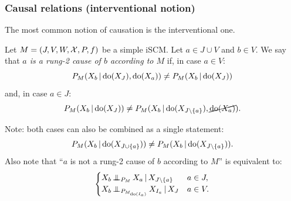 \subsubsection{Causal relations (interventional notion)}
The most common notion of causation is the interventional one.
\begin{Def}\label{def:scm_rung2_cause_of}
  Let $M = \left ( J, V, W, \mathcal{X}, P, f \right )$ be a simple iSCM.
  Let $a \in J \cup V$ and $b \in V$.
  We say that \emph{$a$ is a rung-2 cause of $b$ according to $M$} if, in case $a \in V$:
    $$P_{M}(X_b \operatorname*{|} \operatorname{do}(X_J), \operatorname{do}(X_a)) \ne P_{M}(X_b \operatorname*{|} \operatorname{do}(X_J))$$
  and, in case $a \in J$:
    $$P_{M}(X_b \operatorname*{|} \operatorname{do}(X_J)) \ne P_{M}(X_b \operatorname*{|} \operatorname{do}(X_{J\setminus \{a\}}),\cancel{\operatorname{do}(X_a)}).$$
\end{Def}
\begin{Rem}\label{rem:scm_rung2_cause_of}
  Note: both cases can also be combined as a single statement:
    $$P_{M}(X_b \operatorname*{|} \operatorname{do}(X_{J \cup \{a\}})) \ne P_{M}(X_b \operatorname*{|} \operatorname{do}(X_{J\setminus\{a\}})).$$
  Also note that ``$a$ is not a rung-2 cause of $b$ according to $M$'' is equivalent to:
  \begin{equation*}
    \begin{cases}
      X_b \operatorname*{\perp\mkern-11mu\perp}_{P_{M}} X_a \operatorname*{|} X_{J \setminus \{a\}} & a \in J, \\
      X_b \operatorname*{\perp\mkern-11mu\perp}_{P_{M_{\operatorname{do}(I_a)}}} X_{I_a} \operatorname*{|} X_J & a \in V.
    \end{cases}
  \end{equation*}
\end{Rem}
